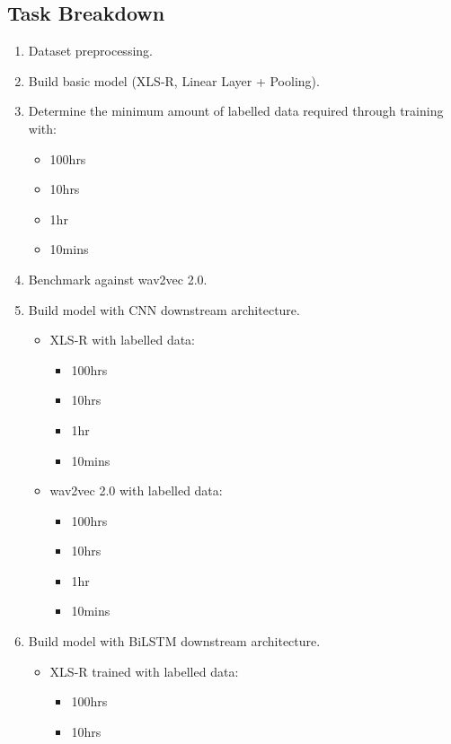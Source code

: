 \subsection{Task Breakdown}\label{sec:task}

\begin{enumerate}
    \item Dataset preprocessing. 
    \item Build basic model (XLS-R, Linear Layer + Pooling).
    \item Determine the minimum amount of labelled data required through training with:
    \begin{itemize}
        \item 100hrs
        \item 10hrs 
        \item 1hr 
        \item 10mins
    \end{itemize} 
    \item Benchmark against wav2vec 2.0. 
    \item Build model with CNN downstream architecture. 
    \begin{itemize}
        \item XLS-R with labelled data: 
        \begin{itemize}
            \item 100hrs
            \item 10hrs 
            \item 1hr 
            \item 10mins
        \end{itemize} 
        \item wav2vec 2.0 with labelled data: 
        \begin{itemize}
            \item 100hrs
            \item 10hrs 
            \item 1hr 
            \item 10mins
        \end{itemize} 
    \end{itemize}
    \item Build model with BiLSTM downstream architecture.
    \begin{itemize}
        \item XLS-R trained with labelled data: 
        \begin{itemize}
            \item 100hrs
            \item 10hrs 

\end{itemize}
\end{itemize}
\end{enumerate}
